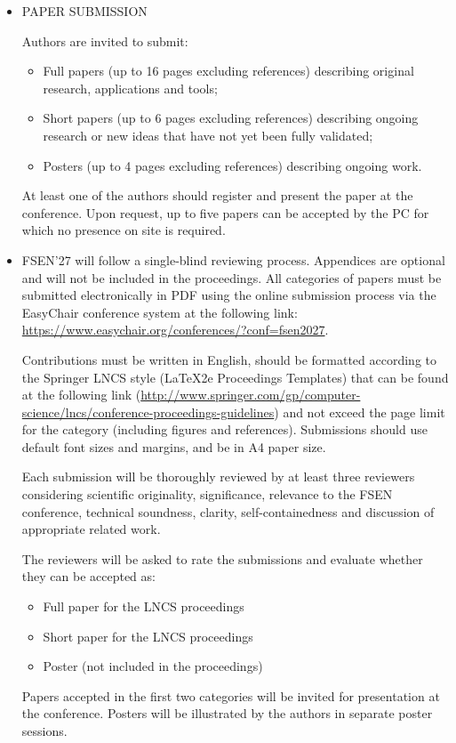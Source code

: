 \documentclass[prodmode,acmtecs]{acmsmall} %
\begin{document}
\begin{itemize}
\item  PAPER SUBMISSION  
 
  Authors are invited to submit: 
 
\begin{itemize}\item  Full papers (up to 16 pages excluding references) describing original research, applications and tools;
\item  Short papers (up to 6 pages excluding references) describing ongoing research or new ideas that have not yet been fully validated;
\item  Posters (up to 4 pages excluding references) describing ongoing work.
\end{itemize} 
  At least one of the authors should register and present the paper at the conference. Upon request, up to five papers can be accepted by the PC for which no presence on site is required. 
 
\item  FSEN'27 will follow a single-blind reviewing process. Appendices are optional and will not be included in the proceedings. All categories of papers must be submitted electronically in PDF using the online submission process via the EasyChair conference system at the following link: \href{https://www.easychair.org/conferences/?conf=fsen2027}{https://www.easychair.org/conferences/?conf=fsen2027}. 
 
  Contributions must be written in English, should be formatted according to the Springer LNCS style (LaTeX2e Proceedings Templates) that can be found at the following link (\href{http://www.springer.com/gp/computer-science/lncs/conference-proceedings-guidelines}{http://www.springer.com/gp/computer-science/lncs/conference-proceedings-guidelines}) and not exceed the page limit for the category (including figures and references). Submissions should use default font sizes and margins, and be in A4 paper size. 
 
  Each submission will be thoroughly reviewed by at least three reviewers considering scientific originality, significance, relevance to the FSEN conference, technical soundness, clarity, self-containedness and discussion of appropriate related work. 
 
  The reviewers will be asked to rate the submissions and evaluate whether they can be accepted as: 
 
\begin{itemize}\item  Full paper for the LNCS proceedings
\item  Short paper for the LNCS proceedings
\item  Poster (not included in the proceedings)
\end{itemize} 
  Papers accepted in the first two categories will be invited for presentation at the conference. Posters will be illustrated by the authors in separate poster sessions. 
 

\end{itemize}
\end{document}
